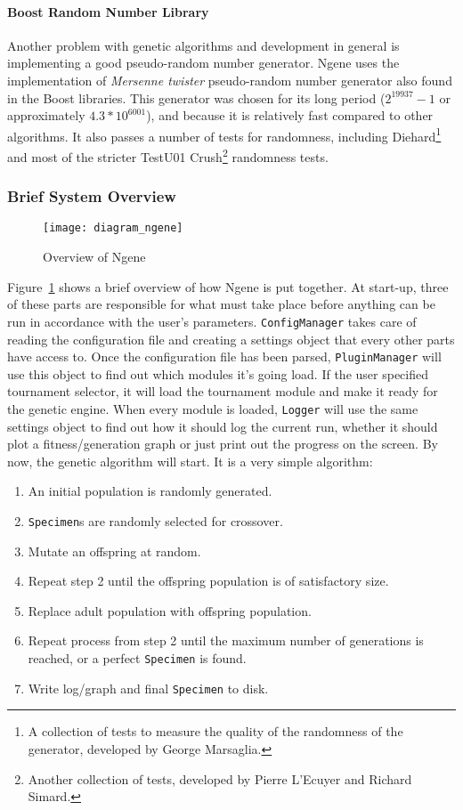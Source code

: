 \paragraph{\textbf{Boost Random Number Library}}\cite{maurer2000}
Another problem with genetic algorithms and development in general is implementing a good pseudo-random number generator. Ngene uses the implementation of \emph{Mersenne twister} pseudo-random number generator also found in the Boost libraries. This generator was chosen for its long period ($2^{19937}-1$ or approximately $4.3*10^{6001}$), and because it is relatively fast compared to other algorithms. It also passes a number of tests for randomness, including Diehard\footnote{A collection of tests to measure the quality of the randomness of the generator, developed by George Marsaglia.} and most of the stricter TestU01 Crush\footnote{Another collection of tests, developed by Pierre L'Ecuyer and Richard Simard.} randomness tests.

\subsubsection{Brief System Overview}
\begin{figure}[!ht]
	\centering
	\texttt{[image: diagram\_ngene]}
	\caption{Overview of Ngene}
	\label{fig:diagram_ngene}
\end{figure}

Figure~\ref{fig:diagram_ngene} shows a brief overview of how Ngene is put together. At start-up, three of these parts are responsible for what must take place before anything can be run in accordance with the user's parameters. \texttt{ConfigManager} takes care of reading the configuration file and creating a settings object that every other parts have access to. Once the configuration file has been parsed, \texttt{PluginManager} will use this object to find out which modules it's going load. If the user specified tournament selector, it will load the tournament module and make it ready for the genetic engine. When every module is loaded, \texttt{Logger} will use the same settings object to find out how it should log the current run, whether it should plot a fitness/generation graph or just print out the progress on the screen. By now, the genetic algorithm will start. It is a very simple algorithm:

\begin{enumerate}
	\itemsep=0pt
	\item An initial population is randomly generated.
	\item \texttt{Specimen}s are randomly selected for crossover.
	\item Mutate an offspring at random.
	\item Repeat step 2 until the offspring population is of satisfactory size.
	\item Replace adult population with offspring population.
	\item Repeat process from step 2 until the maximum number of generations is reached, or a perfect \texttt{Specimen} is found.
	\item Write log/graph and final \texttt{Specimen} to disk.
\end{enumerate}

